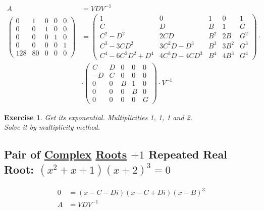 \documentclass[12pt,a4paper]{article}
\newtheorem{exercise}{Exercise}[section]
\begin{document}
\begin{align}
A &= VDV^{-1} \\
\left( \begin{matrix} 0&1&0&0&0 \\ 0&0&1&0&0 \\ 0&0&0&1&0 \\ 0&0&0&0&1 \\ 128 & 80 & 0 & 0 & 0 \end{matrix} \right)
&=
\left( \begin{matrix} 1&0&1&0&1 \\ C&D&B&1&G \\ C^2-D^2&2CD&B^2&2B&G^2 \\ C^3-3CD^2&3C^2D-D^3&B^3&3B^2&G^3 \\ C^4-6C^2D^2+D^4&4C^3D-4CD^3&B^4&4B^3&G^4 \end{matrix} \right) \cdot \nonumber \\
&\cdot \left( \begin{matrix} C & D&0&0&0 \\ -D & C&0&0&0 \\ 0 & 0 & B & 1 & 0 \\ 0 & 0 & 0 & B & 0 \\ 0 & 0 & 0 & 0 & G \end{matrix} \right) \cdot V^{-1}
\end{align}

\begin{exercise}
Get its exponential. Multiplicities 1, 1, 1 and 2. \\
Solve it by multiplicity method.
\end{exercise}

\subsection{Pair of \href{}{Complex} \href{}{Roots} $+ 1$ Repeated Real Root: $(x^2 + x + 1)(x + 2)^3 = 0$}

\begin{align}
0 &= (x - C - Di)(x - C + Di)(x - B)^3 \\
A &= VDV^{-1}
\end{align}
\end{document}

